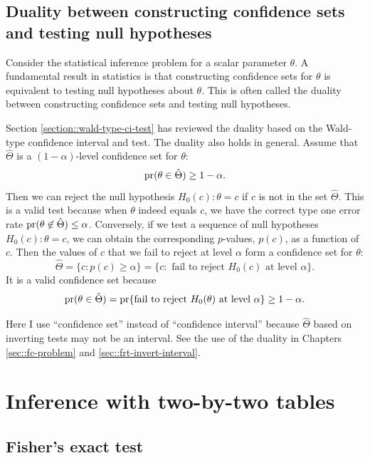  
 
 \subsection{Duality between constructing confidence sets and testing null hypotheses}
 \label{section::duality-ci-testing}

Consider the statistical inference problem for a scalar parameter $\theta$. A fundamental result in statistics is that constructing confidence sets for $\theta$ is equivalent to testing null hypotheses about $\theta$. This is often called the duality between constructing confidence sets and testing null hypotheses. 

Section \ref{section::wald-type-ci-test} has reviewed the duality based on the  Wald-type confidence interval and test. The duality also holds in general. Assume that $\hat\Theta$ is a $(1-\alpha)$-level confidence set for $\theta$:
$$
\textup{pr}(  \theta \in \hat\Theta  ) \geq  1-\alpha.
$$
Then we can reject the null hypothesis $H_0(c): \theta = c$ if $c$ is not in the set $\hat\Theta$. This is a valid test because when $\theta$ indeed equals $c$, we have the correct type one error rate $\textup{pr}(  \theta \not  \in \hat\Theta ) \leq  \alpha$. 
Conversely, if we test a sequence of null hypotheses $H_0(c): \theta = c$, we can obtain the corresponding $p$-values, $p(c)$, as a function of $c$. Then the values of $c$ that we fail to reject at level $\alpha$ form a confidence set for $\theta$:
$$
 \hat\Theta = 
\{  c:  p(c) \geq \alpha \} = \{  c: \text{ fail to reject } H_0(c) \text{ at level } \alpha \} . 
$$
It is a valid confidence set because 
$$
\textup{pr}( \theta \in  \hat\Theta ) = 
\textup{pr}\{  \text{fail to reject } H_0(\theta) \text{ at level } \alpha \} \geq   1-\alpha.
$$


Here I use ``confidence set'' instead of ``confidence interval'' because $ \hat\Theta$ based on inverting tests may not be an interval. 
See the use of the duality in Chapters \ref{sec::fc-problem} and \ref{sec::frt-invert-interval}. 



\section{Inference with two-by-two tables}



\subsection{Fisher's exact test}
\label{sec::fisher-exact-test}

